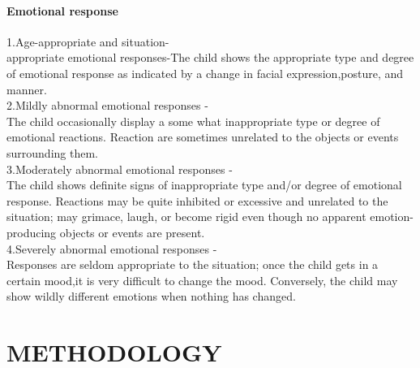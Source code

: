 \subsubsection{Emotional response}
1.Age-appropriate and situation-\\appropriate emotional responses-The child shows the appropriate type and degree of emotional response as indicated by a change in facial expression,posture, and manner. \\
2.Mildly abnormal emotional responses -\\ The child occasionally display a some what inappropriate type or degree of emotional reactions. Reaction are sometimes unrelated to the objects or events surrounding them. \\
3.Moderately abnormal emotional responses -\\  The child shows definite signs of inappropriate type and/or degree of emotional response. Reactions may be quite inhibited or excessive and unrelated to the situation; may grimace, laugh, or become rigid even though no apparent emotion-producing objects or events are present.\\
4.Severely abnormal emotional responses - \\Responses are seldom appropriate to the situation; once the child gets in a certain mood,it is very difficult to change the mood. Conversely, the child may show wildly different emotions when nothing has changed.



\chapter{METHODOLOGY}
